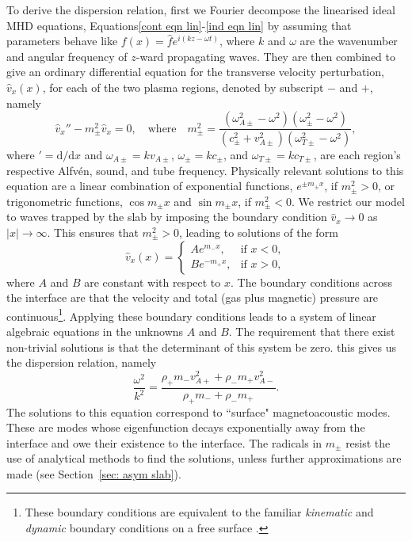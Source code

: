 \documentclass[12pt]{../style-files/ociamthesis}
\begin{document}
To derive the dispersion relation, first we Fourier decompose the linearised ideal MHD equations, Equations\eqref{cont eqn lin}-\eqref{ind eqn lin} by assuming that parameters behave like $f(x) = \hat{f}e^{i(kz - \omega t)}$, where $k$ and $\omega$ are the wavenumber and angular frequency of $z$-ward propagating waves. They are then combined to give an ordinary differential equation for the transverse velocity perturbation, $\hat{v}_x(x)$, for each of the two plasma regions, denoted by subscript $-$ and $+$, namely
\begin{equation}
\hat{v}_x'' - m_\pm^2\hat{v}_x = 0, \quad \text{where} \quad
m_\pm^2 = \frac{(\omega_{A\pm}^2 - \omega^2)(\omega_\pm^2 - \omega^2)}{(c_\pm^2 + v_{A\pm}^2)(\omega_{T\pm}^2 - \omega^2)},
\end{equation}
where $'=\textrm{d}/\textrm{d}x$ and $\omega_{A\pm} = kv_{A\pm}$, $\omega_{\pm} = kc_{\pm}$, and $\omega_{T\pm} = kc_{T\pm}$, are each region's respective Alfv\'{e}n, sound, and tube frequency. Physically relevant solutions to this equation are a linear combination of exponential functions, $e^{\pm m_\pm x}$, if $m_\pm^2 > 0$, or trigonometric functions, $\cos{m_\pm x}$ and $\sin{m_\pm x}$, if $m_\pm^2 < 0$. We restrict our model to waves trapped by the slab by imposing the boundary condition $\hat{v}_x \to 0$ as $|x| \to \infty$. This ensures that $m_\pm^2 > 0$, leading to solutions of the form
\begin{equation}
\hat{v}_x(x)=
\begin{cases}
Ae^{m_-x}, & \text{if } x < 0, \\
Be^{-m_+x}, & \text{if } x > 0,
\end{cases} \label{vsoln}
\end{equation}
where $A$ and $B$ are constant with respect to $x$. The boundary conditions across the interface are that the velocity and total (gas plus magnetic) pressure are continuous\footnote{These boundary conditions are equivalent to the familiar \textit{kinematic} and \textit{dynamic} boundary conditions on a free surface \cite{goe_etal04}.}. Applying these boundary conditions leads to a system of linear algebraic equations in the unknowns $A$ and $B$. The requirement that there exist non-trivial solutions is that the determinant of this system be zero. this gives us the dispersion relation, namely
\begin{equation}
	\frac{\omega^2}{k^2} = \frac{\rho_+m_-v_{A+}^2 + \rho_-m_+v_{A-}^2}{\rho_+m_- + \rho_-m_+}. \label{gov eqn}
\end{equation}
The solutions to this equation correspond to ``surface" magnetoacoustic modes. These are modes whose eigenfunction decays exponentially away from the interface and owe their existence to the interface. The radicals in $m_\pm$ resist the use of analytical methods to find the solutions, unless further approximations are made (see Section~\ref{sec: asym slab}).
\end{document}
